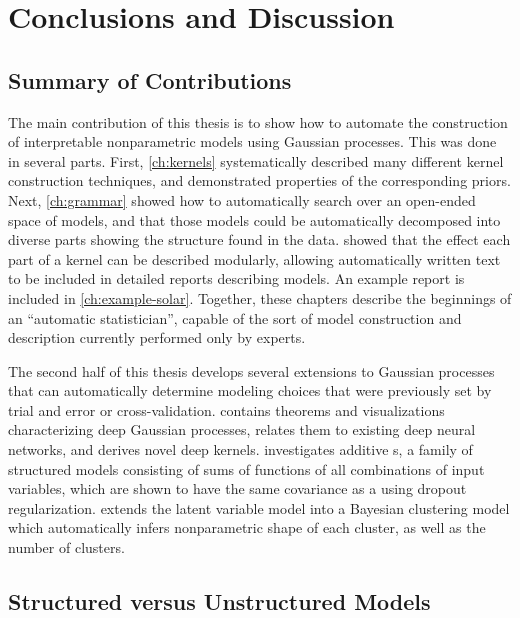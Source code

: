 
\inbpdocument

\chapter{Conclusions and Discussion}
\label{ch:discussion}


\section{Summary of Contributions}

The main contribution of this thesis is to show how to automate the construction of interpretable nonparametric models using Gaussian processes.
This was done in several parts.
First, \cref{ch:kernels} systematically described many different kernel construction techniques, and demonstrated properties of the corresponding \gp{} priors.
Next, \cref{ch:grammar} showed how to automatically search over an open-ended space of \gp{} models, and that those models could be automatically decomposed into diverse parts showing the structure found in the data.
 showed that the effect each part of a kernel can be described modularly, allowing automatically written text to be included in detailed reports describing \gp{} models.
An example report is included in \cref{ch:example-solar}.
Together, these chapters describe the beginnings of an ``automatic statistician'', capable of the sort of model construction and description currently performed only by experts.

The second half of this thesis develops several extensions to Gaussian processes that can automatically determine modeling choices that were previously set by trial and error or cross-validation.
 contains theorems and visualizations characterizing deep Gaussian processes, relates them to existing deep neural networks, and derives novel deep kernels.
 investigates additive \gp{}s, a family of structured models consisting of sums of functions of all combinations of input variables, which are shown to have the same covariance as a \gp{} using dropout regularization.
 extends the \gp{} latent variable model into a Bayesian clustering model which automatically infers nonparametric shape of each cluster, as well as the number of clusters.



\section{Structured versus Unstructured \sgp{} Models}

